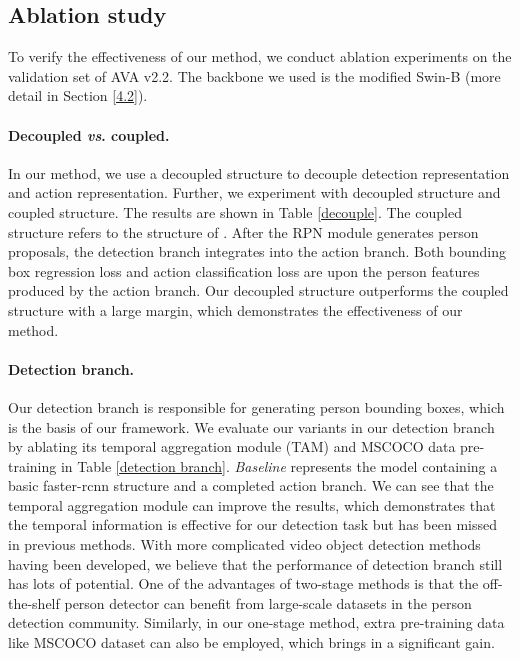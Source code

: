 \documentclass[final]{cvpr}
\begin{document}
\subsection{Ablation study}
To verify the effectiveness of our method, we conduct ablation experiments on the validation set of AVA v2.2. The backbone we used is the modified Swin-B (more detail in Section \ref{4.2}).
\vspace{-3mm}

\paragraph{Decoupled \textit{vs}. coupled.}
In our method, we use a decoupled structure to decouple detection representation and action representation. Further, we experiment with decoupled structure and coupled structure. The results are shown in Table \ref{decouple}. The coupled structure refers to the structure of \cite{Girdhar_2019_CVPR}. After the RPN module generates person proposals, the detection branch integrates into the action branch. Both bounding box regression loss and action classification loss are upon the person features produced by the action branch. Our decoupled structure outperforms the coupled structure with a large margin, which demonstrates the effectiveness of our method.
\vspace{-3mm}

\paragraph{Detection branch.}
Our detection branch is responsible for generating person bounding boxes, which is the basis of our framework.
We evaluate our variants in our detection branch by ablating its temporal aggregation module (TAM) and MSCOCO data pre-training in Table \ref{detection branch}. \textit{Baseline} represents the model containing a basic faster-rcnn structure and a completed action branch. We can see that the temporal aggregation module can improve the results, which demonstrates that the temporal information is effective for our detection task but has been missed in previous methods. With more complicated video object detection methods~\cite{han2020exploiting,chen2020memory} having been developed, we believe that the performance of detection branch still has lots of  potential. One of the advantages of two-stage methods is that the off-the-shelf person detector can benefit from large-scale datasets in the person detection community. Similarly, in our one-stage method, extra pre-training data like MSCOCO dataset can also be employed, which brings in a significant gain. 
\vspace{-3mm}
\end{document}
